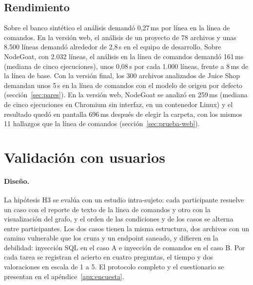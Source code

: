 \subsection{Rendimiento}

Sobre el banco sintético el análisis demandó 0,27\,ms por línea en la
línea de comandos. En la versión web, el análisis de un proyecto de 78
archivos y unas 8.500 líneas demandó alrededor de 2,8\,s en el equipo de
desarrollo. Sobre NodeGoat, con 2.032 líneas, el análisis en la línea de
comandos demandó 161\,ms (mediana de cinco ejecuciones), unos 0,08\,s
por cada 1.000 líneas, frente a 8\,ms de la línea de base. Con la
versión final, los 300 archivos analizados de Juice Shop demandan unos
5\,s en la línea de comandos con el modelo de origen por defecto
(sección~\ref{sec:pares}). En la versión web, NodeGoat se analizó en
259\,ms (mediana de cinco ejecuciones en Chromium sin interfaz, en un
contenedor Linux) y el resultado quedó en pantalla 696\,ms después de
elegir la carpeta, con los mismos 11 hallazgos que la línea de comandos
(sección~\ref{sec:prueba-web}).

\section{Validación con usuarios}\label{sec:validacion-usuarios}

\paragraph{Diseño.} La hipótesis H3 se evalúa con un estudio
intra-sujeto: cada participante resuelve un caso con el reporte de texto
de la línea de comandos y otro con la visualización del grafo, y el
orden de las condiciones y de los casos se alterna entre participantes.
Los dos casos tienen la misma estructura, dos archivos con un camino
vulnerable que los cruza y un endpoint saneado, y difieren en la
debilidad: inyección SQL en el caso A e inyección de comandos en el caso
B. Por cada tarea se registran el acierto en cuatro preguntas, el tiempo
y dos valoraciones en escala de 1 a 5. El protocolo completo y el
cuestionario se presentan en el apéndice~\ref{apx:encuesta}.

